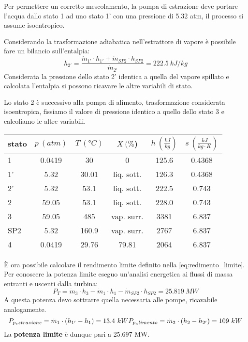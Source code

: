 Per permettere un corretto mescolamento, la pompa di estrazione deve portare l'acqua dallo stato 1 ad uno stato 1' con una pressione di 5.32 atm, il processo si assume
isoentropico.

Considerando la trasformazione adiabatica nell'estrattore di vapore è possibile fare un bilancio sull'entalpia:
\begin{equation*}
    h_{2'} = \frac{\dot m_{1'}\cdot h_{1'} + \dot m_{SP2} \cdot h_{SP2}}{\dot m_{2'}} = 222.5\ kJ/kg
\end{equation*}
Considerata la pressione dello stato 2' identica a quella del vapore spillato e calcolata l'entalpia si possono ricavare le altre variabili di stato.

Lo stato 2 è successivo alla pompa di alimento, trasformazione considerata isoentropica, fissiamo il valore di pressione identico a quello dello stato 3 e calcoliamo
le altre variabili.
\begin{center}
    \begin{tabular}{l|c|c|c|c|c}
        stato    & $p\ (atm)$ & $T\ (\text{°}C) $&$X\ (\%$)& $h\ (\frac{kJ}{kg})$  & $s\ (\frac{kJ}{kg\cdot K})$\\ \hline
        1   &        0.0419 &            30   &    0      & 125.6    &0.4368 \\ \hline     %
        1'  &        5.32    &           30.01   &liq. sott.  & 126.3&0.4368 \\ \hline      %
        2'   &       5.32    &           53.1&liq. sott.& 222.5    &0.743 \\ \hline         %
        2   &        59.05   &           53.1&liq. sott.&  228.0   &0.743   \\ \hline       %
        3   &        59.05   &           485  & vap. surr.& 3381     &6.837  \\ \hline  %
        SP2  &       5.32        &       160.9 &  vap. surr.&2767     &6.837  \\ \hline  %
        4   &        0.0419       &      29.76&     79.81 & 2064     &6.837                 %
    \end{tabular}
\end{center}

È ora possibile calcolare il rendimento limite definito nella \eqref{eq:redimento_limite}. Per conoscere la potenza limite eseguo un'analisi energetica
ai flussi di massa entranti e uscenti dalla turbina:
\begin{equation*}
    P_T = \dot m_3 \cdot h_3 - \dot m_1 \cdot h_1 - \dot m_{SP2} \cdot h_{SP2} = 25.819\ MW
\end{equation*}
A questa potenza devo sottrarre quella necessaria alle pompe, ricavabile analogamente.
\begin{equation*}
    P_{p_estrazione} = \dot m_1 \cdot \left( h_{1'} - h_1 \right) = 13.4\ kW \\
   P_{p_alimento} = \dot m_2 \cdot \left( h_2 - h_{2'} \right) = 109\ kW 
\end{equation*}
La \textbf{potenza limite} è dunque pari a 25.697 MW.

